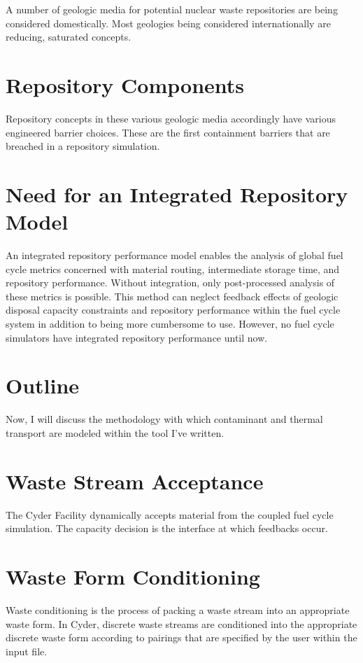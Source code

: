 \documentclass[letterpaper]{article}
\begin{document}
A number of geologic media for potential nuclear waste repositories are being 
considered domestically. Most geologies being considered internationally are 
reducing, saturated concepts.  

\section{Repository Components}

Repository concepts in these various geologic media accordingly have various 
engineered barrier choices. These are the first containment barriers that are 
breached in a repository simulation.

\section{Need for an Integrated Repository Model}

An integrated repository performance model enables the analysis of global fuel 
cycle metrics concerned with material routing, intermediate storage time, and 
repository performance.  Without integration, only post-processed analysis of 
these metrics is possible. This method can neglect feedback effects of geologic 
disposal capacity constraints and repository performance within the fuel cycle 
system in addition to being more cumbersome to use. However, no fuel cycle 
simulators have integrated repository performance until now. 

\section{Outline}

Now, I will discuss the methodology with which contaminant and thermal 
transport are modeled within the tool I've written.

\section{Waste Stream Acceptance}

The Cyder Facility dynamically accepts material from the coupled fuel
cycle simulation. The capacity decision is the interface at which feedbacks 
occur.

\section{Waste Form Conditioning}

Waste conditioning is the process of packing a waste stream into an appropriate 
waste form.  In Cyder, discrete waste streams are conditioned into the 
appropriate discrete waste form according to pairings that are specified by the 
user within the input file.
\end{document}
